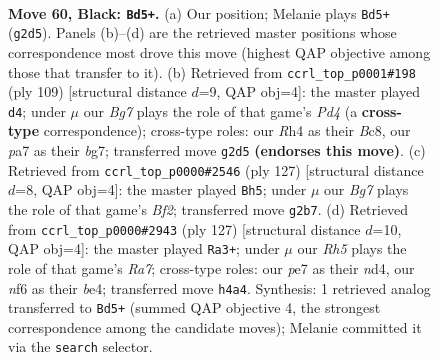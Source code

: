 \documentclass[11pt]{article}
\begin{document}
\clearpage

\begin{figure}[p]\centering
\begin{subfigure}{0.46\textwidth}\centering
\resizebox{\linewidth}{!}{%
\newchessgame
\chessboard[
  setfen={8/P3PK2/5N2/2k5/7r/8/5pb1/8 b - - 2 60},
  showmover=false,
  pgfstyle=straightmove, color=movearrow, markmove={g2-d5}
]}
\caption{}
\end{subfigure}\hfill
\begin{subfigure}{0.46\textwidth}\centering
\resizebox{\linewidth}{!}{%
\newchessgame
\chessboard[
  setfen={2b5/6B1/8/1n1p4/8/3k1PN1/5K2/8 b - - 1 55},
  showmover=false,
  pgfstyle=straightmove, color=movearrow, markmove={d5-d4}
]}
\caption{}
\end{subfigure}
\\[4pt]
\begin{subfigure}{0.46\textwidth}\centering
\resizebox{\linewidth}{!}{%
\newchessgame
\chessboard[
  setfen={8/5b2/3k4/8/7P/8/1KP5/2N5 b - - 1 64},
  showmover=false,
  pgfstyle=straightmove, color=movearrow, markmove={f7-h5}
]}
\caption{}
\end{subfigure}\hfill
\begin{subfigure}{0.46\textwidth}\centering
\resizebox{\linewidth}{!}{%
\newchessgame
\chessboard[
  setfen={5k2/8/8/7p/3NB2P/4K3/r7/8 b - - 3 64},
  showmover=false,
  pgfstyle=straightmove, color=movearrow, markmove={a2-a3}
]}
\caption{}
\end{subfigure}
\caption{\textbf{Move 60, Black: \texttt{Bd5+}.} (a) Our position; Melanie plays \texttt{Bd5+} (\texttt{g2d5}). Panels (b)--(d) are the retrieved master positions whose correspondence most drove this move (highest QAP objective among those that transfer to it). (b) Retrieved from \texttt{ccrl\_top\_p0001\#198} (ply 109) [structural distance $d$=9, QAP obj=4]: the master played \texttt{d4}; under $\mu$ our \emph{Bg7} plays the role of that game's \emph{Pd4} (a \textbf{cross-type} correspondence); cross-type roles: our \emph{R}h4 as their \emph{B}c8, our \emph{p}a7 as their \emph{b}g7; transferred move \texttt{g2d5} \textbf{(endorses this move)}. (c) Retrieved from \texttt{ccrl\_top\_p0000\#2546} (ply 127) [structural distance $d$=8, QAP obj=4]: the master played \texttt{Bh5}; under $\mu$ our \emph{Bg7} plays the role of that game's \emph{Bf2}; transferred move \texttt{g2b7}. (d) Retrieved from \texttt{ccrl\_top\_p0000\#2943} (ply 127) [structural distance $d$=10, QAP obj=4]: the master played \texttt{Ra3+}; under $\mu$ our \emph{Rh5} plays the role of that game's \emph{Ra7}; cross-type roles: our \emph{p}e7 as their \emph{n}d4, our \emph{n}f6 as their \emph{b}e4; transferred move \texttt{h4a4}. Synthesis: 1 retrieved analog transferred to \texttt{Bd5+} (summed QAP objective 4, the strongest correspondence among the candidate moves); Melanie committed it via the \texttt{search} selector.}
\label{fig:thought-m119}
\end{figure}
\end{document}
